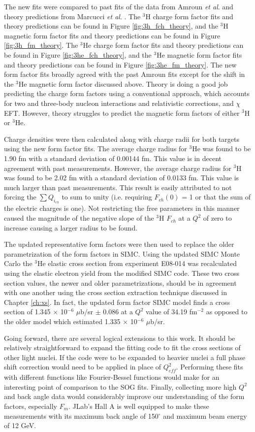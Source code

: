 The new fits were compared to past fits of the data from Amroun \textit{et al}. \cite{Article:Amroun} and theory predictions from Marcucci \textit{et al}. \cite{Article:Marcucci}. The $^3$H charge form factor fits and theory predictions can be found in Figure \ref{fig:3h_fch_theory}, and the $^3$H magnetic form factor fits and theory predictions can be found in Figure \ref{fig:3h_fm_theory}. The $^3$He charge form factor fits and theory predictions can be found in Figure \ref{fig:3he_fch_theory}, and the $^3$He magnetic form factor fits and theory predictions can be found in Figure \ref{fig:3he_fm_theory}. The new form factor fits broadly agreed with the past Amroun fits except for the shift in the $^3$He magnetic form factor discussed above. Theory is doing a good job predicting the charge form factors using a conventional approach, which accounts for two and three-body nucleon interactions and relativistic corrections, and $\chi$EFT. However, theory struggles to predict the magnetic form factors of either $^3$H or $^3$He. 

Charge densities were then calculated along with charge radii for both targets using the new form factor fits. The average charge radius for $^3$He was found to be 1.90 fm with a standard deviation of 0.00144 fm. This value is in decent agreement with past measurements. However, the average charge radius for $^3$H was found to be 2.02 fm with a standard deviation of 0.0133 fm. This value is much larger than past measurements. This result is easily attributed to not forcing the $\sum Q_{i_{ch}}$ to sum to unity (i.e. requiring $F_{ch}(0)$ = 1 or that the sum of the electric charges is one). Not restricting the free parameters in this manner caused the magnitude of the negative slope of the $^3$H $F_{ch}$ at a $Q^2$ of zero to increase causing a larger radius to be found.

The updated representative form factors were then used to replace the older parametrization of the form factors in SIMC. Using the updated SIMC Monte Carlo the $^3$He elastic cross section from experiment E08-014 was recalculated using the elastic electron yield from the modified SIMC code. These two cross section values, the newer and older parametrizations, should be in agreement with one another using the cross section extraction technique discussed in Chapter \ref{ch:xs}. In fact, the updated form factor SIMC model finds a cross section of 1.345 $\times$ 10$^{-6}$ $\mu$b/sr $\pm$ 0.086 at a $Q^2$ value of 34.19 fm$^{-2}$ as opposed to the older model which estimated 1.335 $\times$ 10$^{-6}$ $\mu$b/sr.

Going forward, there are several logical extensions to this work. It should be relatively straightforward to expand the fitting code to fit the cross sections of other light nuclei. If the code were to be expanded to heavier nuclei a full phase shift correction would need to be applied in place of $Q^2_{eff}$. Performing these fits with different functions like Fourier-Bessel functions would make for an interesting point of comparison to the SOG fits. Finally, collecting more high $Q^2$ and back angle data would considerably improve our understanding of the form factors, especially $F_m$. JLab's Hall A is well equipped to make these measurements with its maximum back angle of 150$^{\circ}$ and maximum beam energy of 12 GeV.